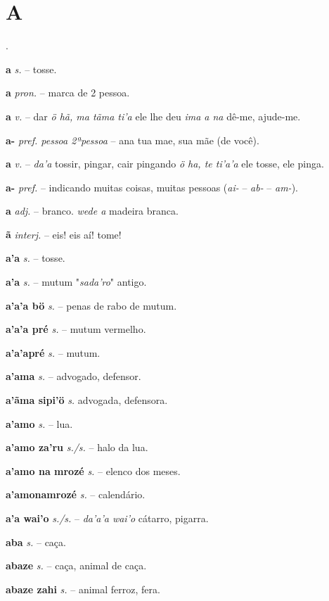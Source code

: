 \section*{A}.


\textbf{a} \textit{s.} -- tosse.

\textbf{a} \textit{pron.} -- marca de 2 pessoa.

\textbf{a} \textit{v.} -- dar  \textit{ö hã, ma tãma ti'a} ele lhe deu  \textit{ima a na} dê-me, ajude-me.

\textbf{a-} \textit{pref. pessoa 2ªpessoa} -- ana tua mae, sua mãe (de você).

\textbf{a} \textit{v.} -- \textit{da'a} tossir, pingar, cair pingando  \textit{ö ha, te ti'a'a} ele tosse, ele pinga.

\textbf{a-} \textit{pref.} -- indicando muitas coisas, muitas pessoas (\textit{ai-} -- \textit{ab-} -- \textit{am-}).

\textbf{a} \textit{adj.} -- branco.  \textit{wede a} madeira branca.

\textbf{ã} \textit{interj.} -- eis! eis aí! tome!

\textbf{a'a} \textit{s.} -- tosse.

\textbf{a'a} \textit{s.} -- mutum  "\textit{sada'ro}" antigo.

\textbf{a'a'a bö} \textit{s.} -- penas de rabo de mutum.

\textbf{a'a'a pré} \textit{s.} -- mutum vermelho.

\textbf{a'a'apré} \textit{s.} -- mutum.

\textbf{a'ama} \textit{s.} -- advogado, defensor.

\textbf{a'ãma sipi'ö} \textit{s.} advogada, defensora.

\textbf{a'amo} \textit{s.} -- lua.

\textbf{a'amo za'ru} \textit{s./s.} -- halo da lua.

\textbf{a'amo na mrozé} \textit{s.} -- elenco dos meses.

\textbf{a'amonamrozé} \textit{s.} -- calendário.

\textbf{a'a wai'o} \textit{s./s.} -- \textit{da'a'a wai'o} cátarro, pigarra.

\textbf{aba} \textit{s.} -- caça.

\textbf{abaze} \textit{s.} -- caça, animal de caça.

\textbf{abaze zahi} \textit{s.} -- animal ferroz, fera.

